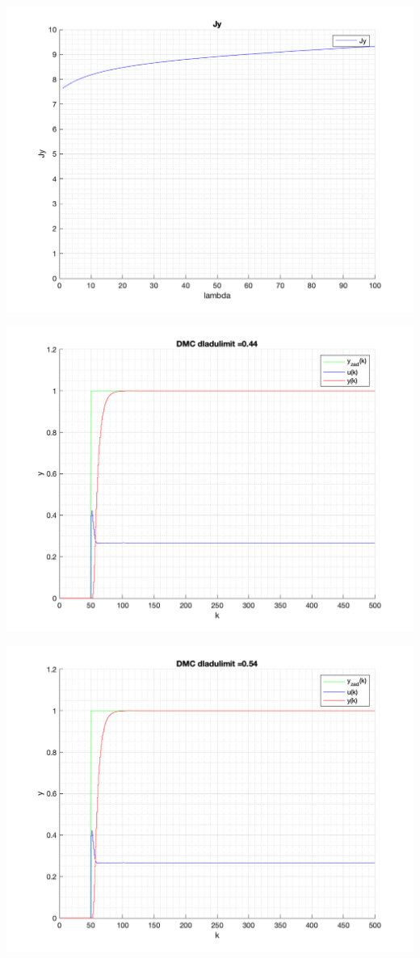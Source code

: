 \documentclass[a4paper, 11pt]{article}
\begin{document}
\begin{enumerate}
 \includegraphics[width=\linewidth]{./ModelsP4_J/Jylambda.png} 
 
 \includegraphics[width=\linewidth]{./ModelsP6_dulimit/P4_DMC_dulimit_0_44_png.png} 
 
 \includegraphics[width=\linewidth]{./ModelsP6_dulimit/P4_DMC_dulimit_0_54_png.png} 
 

\end{enumerate}
\end{document}
